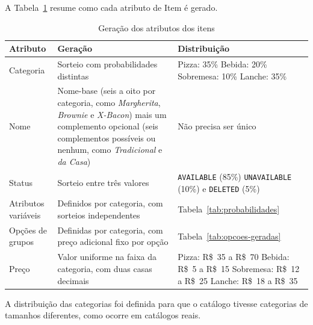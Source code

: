 A Tabela~\ref{tab:geracao-itens} resume como cada atributo de Item é gerado.

\begin{table}[H]
    \centering
    \renewcommand{\arraystretch}{1.1}
    \caption{Geração dos atributos dos itens}
    \label{tab:geracao-itens}
    \small
    \begin{tabular}{|>{\raggedright\arraybackslash}p{3cm}|>{\raggedright\arraybackslash}p{6cm}|>{\raggedright\arraybackslash}p{5.2cm}|}
        \hline
        \textbf{Atributo} & \textbf{Geração} & \textbf{Distribuição} \\ \hline
        Categoria & Sorteio com probabilidades distintas & Pizza: 35\% \newline Bebida: 20\% \newline Sobremesa: 10\% \newline Lanche: 35\% \\ \hline
        Nome & Nome-base (seis a oito por categoria, como \textit{Margherita}, \textit{Brownie} e \textit{X-Bacon}) mais um complemento opcional (seis complementos possíveis ou nenhum, como \textit{Tradicional} e \textit{da Casa}) & Não precisa ser único \\ \hline
        Status & Sorteio entre três valores & \texttt{AVAILABLE} (85\%) \newline \texttt{UNAVAILABLE} (10\%) \newline e \texttt{DELETED} (5\%) \\ \hline
        Atributos variáveis & Definidos por categoria, com sorteios independentes & Tabela~\ref{tab:probabilidades} \\ \hline
        Opções de grupos & Definidas por categoria, com preço adicional fixo por opção & Tabela~\ref{tab:opcoes-geradas} \\ \hline
        Preço & Valor uniforme na faixa da categoria, com duas casas decimais & Pizza: R\$~35 a R\$~70 \newline Bebida: R\$~5 a R\$~15 \newline Sobremesa: R\$~12 a R\$~25 \newline Lanche: R\$~18 a R\$~35 \\ \hline
    \end{tabular}
    \vspace{0.4em}
\end{table}

A distribuição das categorias foi definida para que o catálogo tivesse categorias de tamanhos diferentes, como ocorre em catálogos reais. 

